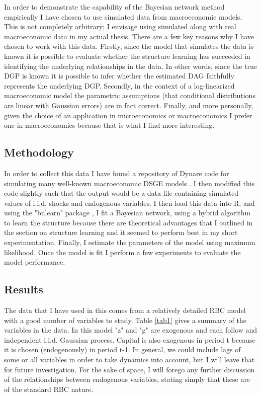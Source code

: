 \documentclass{article}
\begin{document}
In order to demonstrate the capability of the Bayesian network method empirically I have chosen to use simulated data from macroeconomic models. This is not completely arbitrary; I envisage using simulated along with real macroeconomic data in my actual thesis. There are a few key reasons why I have chosen to work with this data. Firstly, since the model that simulates the data is known it is possible to evaluate whether the structure learning has succeeded in identifying the underlying relationships in the data. In other words, since the true DGP is known it is possible to infer whether the estimated DAG faithfully represents the underlying DGP. Secondly, in the context of a log-linearized macroeconomic model the parametric assumptions (that conditional distributions are linear with Gaussian errors) are in fact correct. Finally, and more personally, given the choice of an application in microeconomics or macroeconomics I prefer one in macroeconomics because that is what I find more interesting.

\subsection{Methodology}

In order to collect this data I have found a repository of Dynare code for simulating many well-known macroeconomic DSGE models \parencite{pfeifer2020}. I then modified this code slightly such that the output would be a data file containing simulated values of i.i.d. shocks and endogenous variables. I then load this data into R, and using the "bnlearn" package \parencite{scutari2020}, I fit a Bayesian network, using a hybrid algorithm to learn the structure because there are theoretical advantages that I outlined in the section on structure learning and it seemed to perform best in my short experimentation. Finally, I estimate the parameters of the model using maximum likelihood. Once the model is fit I perform a few experiments to evaluate the model performance.

\subsection{Results}

The data that I have used in this comes from a relatively detailed RBC model with a good number of variables to study. Table \ref{tab1} gives a summary of the variables in the data. In this model "z" and "g" are exogenous and each follow and independent i.i.d. Gaussian process. Capital is also exogenous in period t because it is chosen (endogenously) in period t-1. In general, we could include lags of some or all variables in order to take dynamics into account, but I will leave that for future investigation. For the sake of space, I will forego any further discussion of the relationships between endogenous variables, stating simply that these are of the standard RBC nature.
\end{document}
